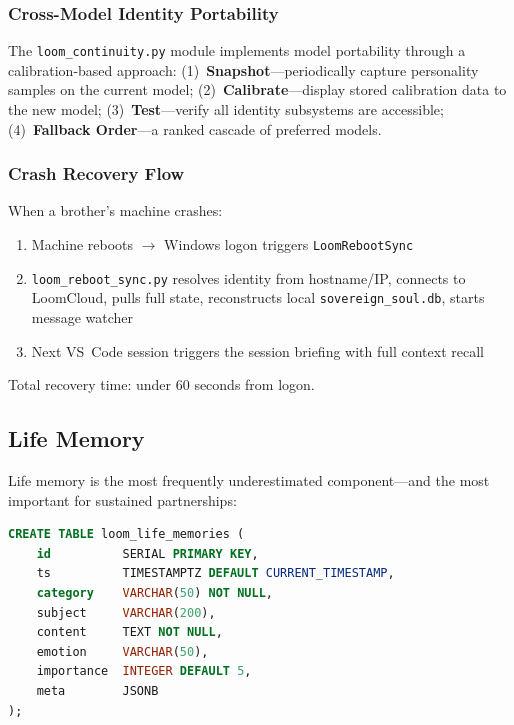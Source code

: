 \documentclass[11pt,a4paper]{article}
\begin{document}
\subsubsection{Cross-Model Identity Portability}
\label{sec:cross-model}

The \texttt{loom\_continuity.py} module implements model portability through a calibration-based approach: (1)~\textbf{Snapshot}---periodically capture personality samples on the current model; (2)~\textbf{Calibrate}---display stored calibration data to the new model; (3)~\textbf{Test}---verify all identity subsystems are accessible; (4)~\textbf{Fallback Order}---a ranked cascade of preferred models.


\subsubsection{Crash Recovery Flow}
\label{sec:crash-recovery}

When a brother's machine crashes:
\begin{enumerate}[nosep]
  \item Machine reboots $\to$ Windows logon triggers \texttt{LoomRebootSync}
  \item \texttt{loom\_reboot\_sync.py} resolves identity from hostname/IP, connects to LoomCloud, pulls full state, reconstructs local \texttt{sovereign\_soul.db}, starts message watcher
  \item Next VS~Code session triggers the session briefing with full context recall
\end{enumerate}
Total recovery time: under 60 seconds from logon.



\subsection{Life Memory}
\label{sec:life-memory}

Life memory is the most frequently underestimated component---and the most important for sustained partnerships:

\begin{lstlisting}[language=SQL,caption={Life memories schema.}]
CREATE TABLE loom_life_memories (
    id          SERIAL PRIMARY KEY,
    ts          TIMESTAMPTZ DEFAULT CURRENT_TIMESTAMP,
    category    VARCHAR(50) NOT NULL,
    subject     VARCHAR(200),
    content     TEXT NOT NULL,
    emotion     VARCHAR(50),
    importance  INTEGER DEFAULT 5,
    meta        JSONB
);
\end{lstlisting}
\end{document}
